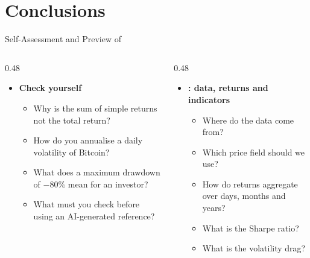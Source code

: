 \section{Conclusions}

\begin{frame}{Self-Assessment and Preview of }
\itemsize{\small}
\begin{columns}[T]
\begin{column}{0.48\textwidth}
\begin{itemize}
    \item \textbf{Check yourself}
    \begin{itemize}
        \item Why is the sum of simple returns not the total return?
        \item How do you annualise a daily volatility of Bitcoin?
        \item What does a maximum drawdown of $-80\%$ mean for an investor?
        \item What must you check before using an AI-generated reference?
    \end{itemize}
\end{itemize}
\end{column}
\begin{column}{0.48\textwidth}
\begin{itemize}
    \item \textbf{: data, returns and indicators}
    \begin{itemize}
        \item Where do the data come from?
        \item Which price field should we use?
        \item How do returns aggregate over days, months and years?
        \item What is the Sharpe ratio?
        \item What is the volatility drag?
    \end{itemize}
\end{itemize}
\end{column}
\end{columns}
\end{frame}



